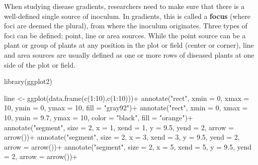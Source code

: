 \documentclass[
  letterpaper,
  DIV=11,
  numbers=noendperiod]{scrreprt}
\newenvironment{Shaded}{\begin{snugshade}}{\end{snugshade}}
\newcommand{\AttributeTok}[1]{\textcolor[rgb]{0.40,0.45,0.13}{#1}}
\newcommand{\DecValTok}[1]{\textcolor[rgb]{0.68,0.00,0.00}{#1}}
\newcommand{\FloatTok}[1]{\textcolor[rgb]{0.68,0.00,0.00}{#1}}
\newcommand{\FunctionTok}[1]{\textcolor[rgb]{0.28,0.35,0.67}{#1}}
\newcommand{\NormalTok}[1]{\textcolor[rgb]{0.00,0.23,0.31}{#1}}
\newcommand{\OtherTok}[1]{\textcolor[rgb]{0.00,0.23,0.31}{#1}}
\newcommand{\SpecialCharTok}[1]{\textcolor[rgb]{0.37,0.37,0.37}{#1}}
\newcommand{\StringTok}[1]{\textcolor[rgb]{0.13,0.47,0.30}{#1}}
\begin{document}
When studying disease gradients, researchers need to make sure that
there is a well-defined single source of inoculum. In gradients, this is
called a \textbf{focus} (where foci are deemed the plural), from where
the inoculum originates. Three types of foci can be defined: point, line
or area sources. While the point source can be a plant or group of
plants at any position in the plot or field (center or corner), line and
area sources are usually defined as one or more rows of diseased plants
at one side of the plot or field.

\begin{Shaded}
\begin{Highlighting}[]
\FunctionTok{library}\NormalTok{(ggplot2)}

\NormalTok{line }\OtherTok{\textless{}{-}} \FunctionTok{ggplot}\NormalTok{(}\FunctionTok{data.frame}\NormalTok{(}\FunctionTok{c}\NormalTok{(}\DecValTok{1}\SpecialCharTok{:}\DecValTok{10}\NormalTok{),}\FunctionTok{c}\NormalTok{(}\DecValTok{1}\SpecialCharTok{:}\DecValTok{10}\NormalTok{)))}\SpecialCharTok{+}
  \FunctionTok{annotate}\NormalTok{(}\StringTok{"rect"}\NormalTok{, }\AttributeTok{xmin =} \DecValTok{0}\NormalTok{, }\AttributeTok{xmax =} \DecValTok{10}\NormalTok{, }\AttributeTok{ymin =} \DecValTok{0}\NormalTok{, }\AttributeTok{ymax =} \DecValTok{10}\NormalTok{, }\AttributeTok{fill =} \StringTok{"gray92"}\NormalTok{)}\SpecialCharTok{+}
  \FunctionTok{annotate}\NormalTok{(}\StringTok{"rect"}\NormalTok{, }\AttributeTok{xmin =} \DecValTok{0}\NormalTok{, }\AttributeTok{xmax =} \DecValTok{10}\NormalTok{, }\AttributeTok{ymin =} \FloatTok{9.7}\NormalTok{, }\AttributeTok{ymax =} \DecValTok{10}\NormalTok{, }\AttributeTok{color =} \StringTok{"black"}\NormalTok{, }\AttributeTok{fill =} \StringTok{"orange"}\NormalTok{)}\SpecialCharTok{+}
  \FunctionTok{annotate}\NormalTok{(}\StringTok{"segment"}\NormalTok{, }\AttributeTok{size =} \DecValTok{2}\NormalTok{, }\AttributeTok{x =} \DecValTok{1}\NormalTok{, }\AttributeTok{xend =} \DecValTok{1}\NormalTok{, }\AttributeTok{y =} \FloatTok{9.5}\NormalTok{, }\AttributeTok{yend =} \DecValTok{2}\NormalTok{, }\AttributeTok{arrow =} \FunctionTok{arrow}\NormalTok{())}\SpecialCharTok{+}
  \FunctionTok{annotate}\NormalTok{(}\StringTok{"segment"}\NormalTok{, }\AttributeTok{size =} \DecValTok{2}\NormalTok{, }\AttributeTok{x =} \DecValTok{3}\NormalTok{, }\AttributeTok{xend =} \DecValTok{3}\NormalTok{, }\AttributeTok{y =} \FloatTok{9.5}\NormalTok{, }\AttributeTok{yend =} \DecValTok{2}\NormalTok{, }\AttributeTok{arrow =} \FunctionTok{arrow}\NormalTok{())}\SpecialCharTok{+}
  \FunctionTok{annotate}\NormalTok{(}\StringTok{"segment"}\NormalTok{, }\AttributeTok{size =} \DecValTok{2}\NormalTok{, }\AttributeTok{x =} \DecValTok{5}\NormalTok{, }\AttributeTok{xend =} \DecValTok{5}\NormalTok{, }\AttributeTok{y =} \FloatTok{9.5}\NormalTok{, }\AttributeTok{yend =} \DecValTok{2}\NormalTok{, }\AttributeTok{arrow =} \FunctionTok{arrow}\NormalTok{())}\SpecialCharTok{+}

\end{Highlighting}
\end{Shaded}
\end{document}
